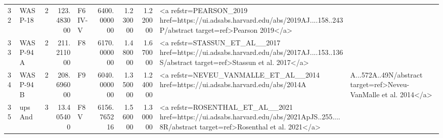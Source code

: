 \begin{tabular}{llrrlrrrl}
32 & WASP-18 & 2 & 123.483000 & F6 IV-V & 6400.000000 & 1.230000 & 1.220000 & <a refstr=PEARSON_2019 href=https://ui.adsabs.harvard.edu/abs/2019AJ....158..243P/abstract target=ref>Pearson 2019</a> \\
33 & WASP-94 A & 2 & 211.211000 & F8 & 6170.000000 & 1.480000 & 1.670000 & <a refstr=STASSUN_ET_AL__2017 href=https://ui.adsabs.harvard.edu/abs/2017AJ....153..136S/abstract target=ref>Stassun et al. 2017</a> \\
34 & WASP-94 B & 2 & 208.696000 & F9 & 6040.000000 & 1.350000 & 1.240000 & <a refstr=NEVEU_VANMALLE_ET_AL__2014 href=https://ui.adsabs.harvard.edu/abs/2014A&A...572A..49N/abstract target=ref>Neveu-VanMalle et al. 2014</a> \\
35 & ups And & 3 & 13.405400 & F8 V & 6156.765216 & 1.560000 & 1.300000 & <a refstr=ROSENTHAL_ET_AL__2021 href=https://ui.adsabs.harvard.edu/abs/2021ApJS..255....8R/abstract target=ref>Rosenthal et al. 2021</a> \\
\bottomrule
\end{tabular}
